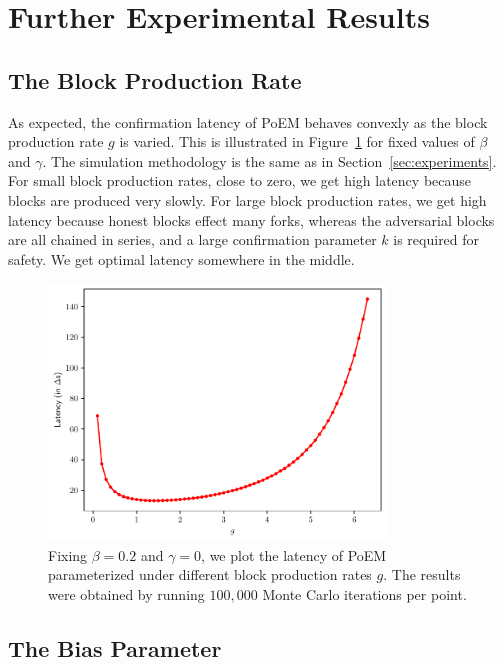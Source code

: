 \section{Further Experimental Results}\label{sec:more-experiments}

\subsection{The Block Production Rate}

As expected, the confirmation latency of PoEM behaves convexly as the block production rate $g$ is varied.
This is illustrated in Figure~\ref{fig:g_latency} for fixed values of $\beta$ and $\gamma$.
The simulation methodology is the same as in Section~\ref{sec:experiments}.
For small block production rates, close to zero, we get high latency because blocks are produced very slowly.
For large block production rates, we get high latency because honest blocks effect many forks, whereas the adversarial blocks
are all chained in series, and a large confirmation parameter $k$ is required for safety.
We get optimal latency somewhere in the middle.

\begin{figure}[pt]
  \centering
  \includegraphics[width = 0.8\textwidth]{figures/g_latency.pdf}

  \caption{Fixing $\beta=0.2$ and $\gamma=0$, we plot the latency of PoEM parameterized under different block production rates $g$.
           The results were obtained by running $100{,}000$ Monte Carlo iterations per point.}
  \label{fig:g_latency}
\end{figure}

\subsection{The Bias Parameter}

